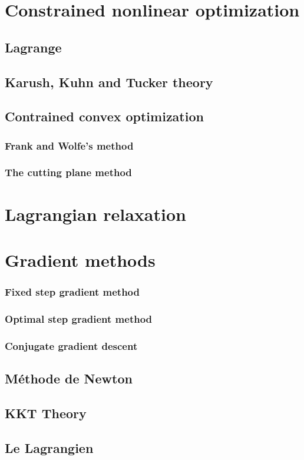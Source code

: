 \documentclass[12pt]{book}
\begin{document}
\section{Constrained nonlinear optimization}
\subsection{Lagrange}
\subsection{Karush, Kuhn and Tucker theory}
\subsection{Contrained convex optimization}
\subsubsection{Frank and Wolfe's method}
\subsubsection{The cutting plane method}
\section{Lagrangian relaxation}
\section{Gradient methods}
\subsubsection{Fixed step gradient method}
\subsubsection{Optimal step gradient method}
\subsubsection{Conjugate gradient descent}
\subsection{Méthode de Newton}
\subsection{KKT Theory}
\subsection{Le Lagrangien}
\end{document}
